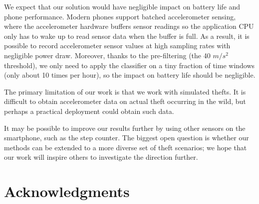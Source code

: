 \documentclass{soups}
\begin{document}
We expect that our solution would have negligible impact on battery life and phone performance.
Modern phones support batched accelerometer sensing, where the accelerometer hardware buffers sensor readings so the application CPU only has to wake up to read sensor data when the buffer is full.
As a result, it is possible to record accelerometer sensor values at high sampling rates with negligible power draw.
Moreover, thanks to the pre-filtering (the 40 $m/s^2$ threshold),
we only need to apply the classifier on a tiny fraction of time windows (only about 10 times per hour),
so the impact on battery life should be negligible.

The primary limitation of our work is that we work with simulated thefts.
It is difficult to obtain accelerometer data on actual theft occurring in the wild, but perhaps a practical deployment could obtain such data.

It may be possible to improve our results further by using other sensors on the smartphone, such as the step counter.
The biggest open question is whether our methods can be extended to a more diverse set of theft scenarios; we hope that our work will inspire others to investigate the direction further.




\section{Acknowledgments}

%
\end{document}
